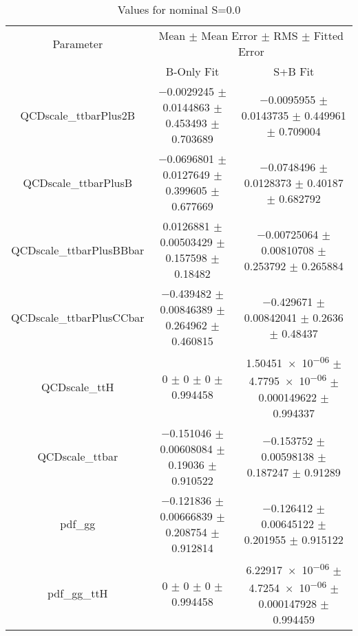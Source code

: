 \begin{table}
\centering
\caption{Values for nominal S=0.0}
\begin{tabular}{ccc}
\toprule
Parameter & \multicolumn{2}{c}{Mean $\pm$ Mean Error $\pm$ RMS $\pm$ Fitted Error}\\
 & B-Only Fit & S+B Fit\\
\midrule
QCDscale\_ttbarPlus2B & \num{-0.0029245} $\pm$ \num{0.0144863} $\pm$ \num{0.453493} $\pm$ \num{0.703689} & \num{-0.0095955} $\pm$ \num{0.0143735} $\pm$ \num{0.449961} $\pm$ \num{0.709004}\\
QCDscale\_ttbarPlusB & \num{-0.0696801} $\pm$ \num{0.0127649} $\pm$ \num{0.399605} $\pm$ \num{0.677669} & \num{-0.0748496} $\pm$ \num{0.0128373} $\pm$ \num{0.40187} $\pm$ \num{0.682792}\\
QCDscale\_ttbarPlusBBbar & \num{0.0126881} $\pm$ \num{0.00503429} $\pm$ \num{0.157598} $\pm$ \num{0.18482} & \num{-0.00725064} $\pm$ \num{0.00810708} $\pm$ \num{0.253792} $\pm$ \num{0.265884}\\
QCDscale\_ttbarPlusCCbar & \num{-0.439482} $\pm$ \num{0.00846389} $\pm$ \num{0.264962} $\pm$ \num{0.460815} & \num{-0.429671} $\pm$ \num{0.00842041} $\pm$ \num{0.2636} $\pm$ \num{0.48437}\\
QCDscale\_ttH & \num{0} $\pm$ \num{0} $\pm$ \num{0} $\pm$ \num{0.994458} & \num{1.50451e-06} $\pm$ \num{4.7795e-06} $\pm$ \num{0.000149622} $\pm$ \num{0.994337}\\
QCDscale\_ttbar & \num{-0.151046} $\pm$ \num{0.00608084} $\pm$ \num{0.19036} $\pm$ \num{0.910522} & \num{-0.153752} $\pm$ \num{0.00598138} $\pm$ \num{0.187247} $\pm$ \num{0.91289}\\
pdf\_gg & \num{-0.121836} $\pm$ \num{0.00666839} $\pm$ \num{0.208754} $\pm$ \num{0.912814} & \num{-0.126412} $\pm$ \num{0.00645122} $\pm$ \num{0.201955} $\pm$ \num{0.915122}\\
pdf\_gg\_ttH & \num{0} $\pm$ \num{0} $\pm$ \num{0} $\pm$ \num{0.994458} & \num{6.22917e-06} $\pm$ \num{4.7254e-06} $\pm$ \num{0.000147928} $\pm$ \num{0.994459}\\
\bottomrule
\end{tabular}
\end{table}